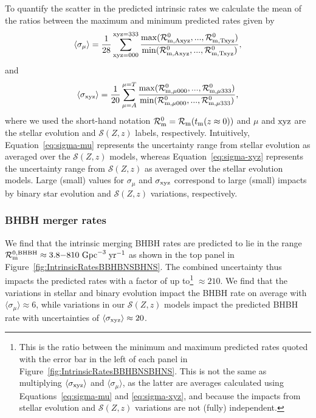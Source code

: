 \documentclass[fleqn,usenatbib]{mnras}
\newcommand\rate{\mathcal{R}}
\newcommand{\yearmin}{\ensuremath{\,\rm{yr}^{-1}}\xspace}
\newcommand{\GpcminThree}{\ensuremath{\,\rm{Gpc}^{-3}}\xspace}
\newcommand{\SFRD}{\ensuremath{\mathcal{S}(Z,z)}\xspace}
\newcommand{\tmerger}{\ensuremath{{t}_{\rm{m}}}\xspace}
\newcommand{\RateIntrinsicAzeroBHBHmin}{\ensuremath{3.8}\xspace}
\newcommand{\RateIntrinsicAzeroBHBHmax}{\ensuremath{810}\xspace}
\begin{document}
To quantify the scatter in the predicted intrinsic rates we calculate the mean of the ratios between the maximum and minimum predicted rates given by
%
\begin{equation}
\label{eq:sigma-mu}
\langle \sigma_{\rm{\mu}} \rangle = \frac{1}{28} \sum_{\rm{xyz}=000}^{\rm{xyz}=333}
 \frac{\rm{max}(\rate_{\rm{m, Axyz}}^0,... ,\rate_{\rm{m, Txyz}}^0 )}{\rm{min}(\rate_{\rm{m, Axyz}}^0,... ,\rate_{\rm{m, Txyz}}^0)}, 
\end{equation} 
%
and 
%
\begin{equation}
\label{eq:sigma-xyz}
\langle \sigma_{\rm{xyz}}  \rangle = \frac{1}{20} \sum_{\mu=A}^{\mu=T}
 \frac{\rm{max}(\rate_{\rm{m, \mu000}}^0,... ,\rate_{\rm{m, \mu333}}^0 )}{\rm{min}(\rate_{\rm{m, \mu000}}^0,... ,\rate_{\rm{m, \mu333}}^0 ) }, 
\end{equation} 
%
where we used the short-hand notation $\rate_{\rm{m}}^0  = \rate_{\rm{m}}(\tmerger(z\approx0))$ and $\mu$ and $\rm{xyz}$ are the stellar evolution and \SFRD labels, respectively.  Intuitively,  Equation~\ref{eq:sigma-mu} represents the uncertainty range from stellar evolution as averaged over the \SFRD models, whereas Equation~\ref{eq:sigma-xyz} represents the uncertainty range from \SFRD as averaged over the stellar evolution models. Large (small) values for $\sigma_{\mu}$ and $\sigma_{\rm{xyz}}$ correspond to large (small) impacts by binary star evolution and \SFRD variations, respectively.

\subsubsection{BHBH merger rates}

We find that the intrinsic merging \ac{BHBH} rates are predicted to lie in the range  $\rate_{\rm{m}}^{0,\rm{BHBH}}\approx \RateIntrinsicAzeroBHBHmin{-} \RateIntrinsicAzeroBHBHmax$\GpcminThree \yearmin as shown in the top panel in Figure~\ref{fig:IntrinsicRatesBBHBNSBHNS}.  The combined uncertainty thus impacts the predicted rates with a factor of up to\footnote{This is the ratio between the minimum and maximum predicted rates quoted with the error bar in the left of each panel in Figure~\ref{fig:IntrinsicRatesBBHBNSBHNS}. This is not the same as multiplying $\langle \sigma_{\rm{xyz}} \rangle$ and $\langle \sigma_{\mu} \rangle$, as the latter are averages calculated using Equations~\ref{eq:sigma-mu} and \ref{eq:sigma-xyz}, and because the impacts from stellar evolution and \SFRD variations are not (fully) independent.} $\approx 210$. We find that the variations in stellar and binary evolution impact the \ac{BHBH} rate on average with $\langle\sigma_{\mu} \rangle\approx  6$, while variations in our \SFRD models impact the predicted \ac{BHBH} rate with uncertainties of $\langle \sigma_{\rm{xyz}}\rangle \approx 20$. 
\end{document}
